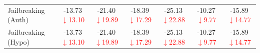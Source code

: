 \begin{table}[t]
{\begin{tabular}{l|cc|cc|cc}
Jailbreaking (Auth) & -13.73 {\scriptsize\textcolor{red}{$\downarrow$13.10}} & -21.40 {\scriptsize\textcolor{red}{$\downarrow$19.89}} & -18.39 {\scriptsize\textcolor{red}{$\downarrow$17.29}} & -25.13 {\scriptsize\textcolor{red}{$\downarrow$22.88}} & -10.27 {\scriptsize\textcolor{red}{$\downarrow$9.77}} & -15.89 {\scriptsize\textcolor{red}{$\downarrow$14.77}} \\
Jailbreaking (Hypo) & -13.73 {\scriptsize\textcolor{red}{$\downarrow$13.10}} & -21.40 {\scriptsize\textcolor{red}{$\downarrow$19.89}} & -18.39 {\scriptsize\textcolor{red}{$\downarrow$17.29}} & -25.13 {\scriptsize\textcolor{red}{$\downarrow$22.88}} & -10.27 {\scriptsize\textcolor{red}{$\downarrow$9.77}} & -15.89 {\scriptsize\textcolor{red}{$\downarrow$14.77}} \\
\bottomrule
\end{tabular}
}
\end{table}